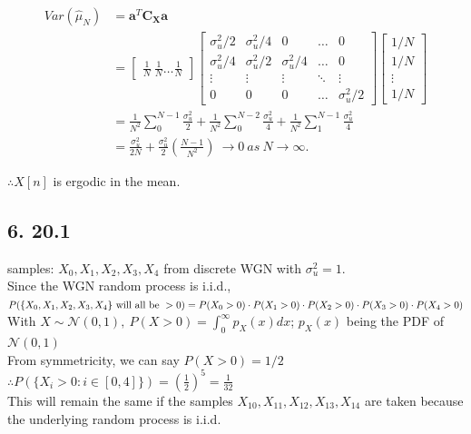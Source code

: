\documentclass[12pt]{article}
\begin{document}
\begin{align*}
  Var(\hat{\mu}_N) &= \mathbf{a}^T \mathbf{C_X} \mathbf{a}\\[8pt]
  &= \begin{bmatrix} \frac{1}{N} \ \frac{1}{N} \dots \frac{1}{N} \end{bmatrix} \begin{bmatrix} \sigma_u^2/2 & \sigma_u^2/4 & 0 & \dots & 0 \\ \sigma_u^2/4 & \sigma_u^2/2 & \sigma_u^2/4 & \dots & 0 \\ \vdots & \vdots & \vdots & \ddots & \vdots \\ 0 & 0 & 0 & \dots & \sigma_u^2/2 \end{bmatrix} \begin{bmatrix} 1/N \\ 1/N \\ \vdots \\ 1/N \end{bmatrix} \\[8pt]
  &= \frac{1}{N^2} \sum_{0}^{N-1} \frac{\sigma_u^2}{2} + \frac{1}{N^2} \sum_{0}^{N-2} \frac{\sigma_u^2}{4} + \frac{1}{N^2} \sum_{1}^{N-1} \frac{\sigma_u^2}{4} \\[8pt]
  &= \frac{\sigma_u^2}{2N} + \frac{\sigma_u^2}{2} \left( \frac{N-1}{N^2} \right)\ \rightarrow 0 \ as \ N \rightarrow \infty.
\end{align*}

$\therefore X[n]$ is ergodic in the mean.

\subsection*{6. 20.1}
\label{subsec:1.6}

 samples: $X_0, X_1, X_2, X_3, X_4$ from discrete WGN with $\sigma_u^2 = 1$.\\[8pt]
Since the WGN random process is i.i.d.,$P(\{X_0, X_1, X_2, X_3, X_4\} \text{ will all be } > 0) = \\[8pt]
P(X_0 > 0) \cdot P(X_1 > 0) \cdot P(X_2 > 0) \cdot P(X_3 > 0) \cdot P(X_4 > 0)$\\[8pt]
With $X \sim \mathcal{N}(0, 1), \ P(X > 0) = \int_{0}^{\infty} p_X(x) dx$; $p_X(x)$ being the PDF of $\mathcal{N}(0, 1)$\\[8pt]
From symmetricity, we can say $P(X > 0) = 1/2$ \\[8pt]
$\therefore P(\{X_i > 0 : i \in [0, 4]\}) = \left(\frac{1}{2}\right)^5 = \frac{1}{32}$\\[8pt]
This will remain the same if the samples $X_{10}, X_{11}, X_{12}, X_{13}, X_{14}$ are taken because the underlying random process is i.i.d.
\end{document}
